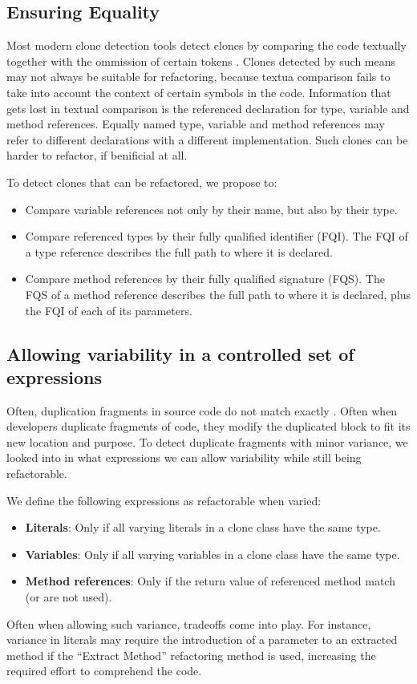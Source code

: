 \documentclass[sigconf,review]{acmart}
\begin{document}
\subsection{Ensuring Equality}
Most modern clone detection tools detect clones by comparing the code textually together with the ommission of certain tokens \cite{roy2009comparison, svajlenko2014evaluating}. Clones detected by such means may not always be suitable for refactoring, because textua comparison fails to take into account the context of certain symbols in the code. Information that gets lost in textual comparison is the referenced declaration for type, variable and method references. Equally named type, variable and method references may refer to different declarations with a different implementation. Such clones can be harder to refactor, if benificial at all.

To detect clones that can be refactored, we propose to:
\begin{itemize}
  \item Compare variable references not only by their name, but also by their type.
  \item Compare referenced types by their fully qualified identifier (FQI). The FQI of a type reference describes the full path to where it is declared.
  \item Compare method references by their fully qualified signature (FQS). The FQS of a method reference describes the full path to where it is declared, plus the FQI of each of its parameters.
\end{itemize}


\subsection{Allowing variability in a controlled set of expressions} \label{sec:t2r}
Often, duplication fragments in source code do not match exactly \cite{kodhai2013method}. Often when developers duplicate fragments of code, they modify the duplicated block to fit its new location and purpose. To detect duplicate fragments with minor variance, we looked into in what expressions we can allow variability while still being refactorable.

We define the following expressions as refactorable when varied:
\begin{itemize}
  \item \textbf{Literals}: Only if all varying literals in a clone class have the same type.
  \item \textbf{Variables}: Only if all varying variables in a clone class have the same type.
  \item \textbf{Method references}: Only if the return value of referenced method match (or are not used).
\end{itemize}
Often when allowing such variance, tradeoffs come into play. For instance, variance in literals may require the introduction of a parameter to an extracted method if the ``Extract Method'' refactoring method is used, increasing the required effort to comprehend the code.
\end{document}
